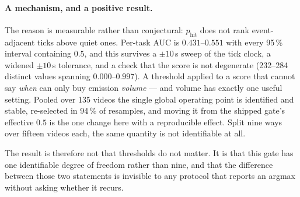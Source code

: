 \paragraph{A mechanism, and a positive result.} The reason is measurable rather
than conjectural: $p_{\mathrm{hit}}$ does not rank event-adjacent ticks above quiet
ones. Per-task AUC is $0.431$--$0.551$ with every 95\,\% interval containing $0.5$,
and this survives a $\pm 10$\,s sweep of the tick clock, a widened $\pm 10$\,s
tolerance, and a check that the score is not degenerate (232--284 distinct values
spanning $0.000$--$0.997$). A threshold applied to a score that cannot say
\emph{when} can only buy emission \emph{volume} --- and volume has exactly one
useful setting. Pooled over 135 videos the single global operating point is
identified and stable, re-selected in 94\,\% of resamples, and moving it from the
shipped gate's effective $0.5$ is the one change here with a reproducible effect.
Split nine ways over fifteen videos each, the same quantity is not identifiable at
all.

The result is therefore not that thresholds do not matter. It is that this gate has
one identifiable degree of freedom rather than nine, and that the difference
between those two statements is invisible to any protocol that reports an argmax
without asking whether it recurs.
